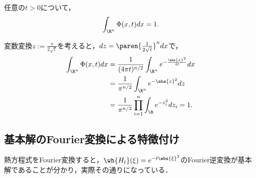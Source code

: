 \documentclass[uplatex,dvipdfmx]{jsreport}
\begin{document}
\begin{lemma}
    任意の$t>0$について，
    \[\int_{\R^n}\Phi(x,t)dx=1.\]
\end{lemma}
\begin{Proof}
    変数変換$z:=\frac{x}{2\sqrt{t}}$を考えると，$dz=\paren{\frac{1}{2\sqrt{t}}}^ndx$で，
    \begin{align*}
        \int_{\R^n}\Phi(x,t)dx&=\frac{1}{(4\pi t)^{n/2}}\int_{\R^n}e^{-\frac{\abs{x}^2}{4t}}dx\\
        &=\frac{1}{\pi^{n/2}}\int_{\R^n}e^{-\abs{z}^2}dz\\
        &=\frac{1}{\pi^{n/2}}\prod_{i=1}^n\int_\R e^{-z^2_i}dz_i=1.
    \end{align*}
\end{Proof}

\subsection{基本解のFourier変換による特徴付け}

\begin{tcolorbox}[colframe=ForestGreen, colback=ForestGreen!10!white,breakable,colbacktitle=ForestGreen!40!white,coltitle=black,fonttitle=\bfseries\sffamily,
    title=]
    熱方程式をFourier変換すると，$\wh{H_t}(\xi)=e^{-t\abs{\xi}^2}$のFourier逆変換が基本解であることが分かり，実際その通りになっている．
\end{tcolorbox}
\end{document}
